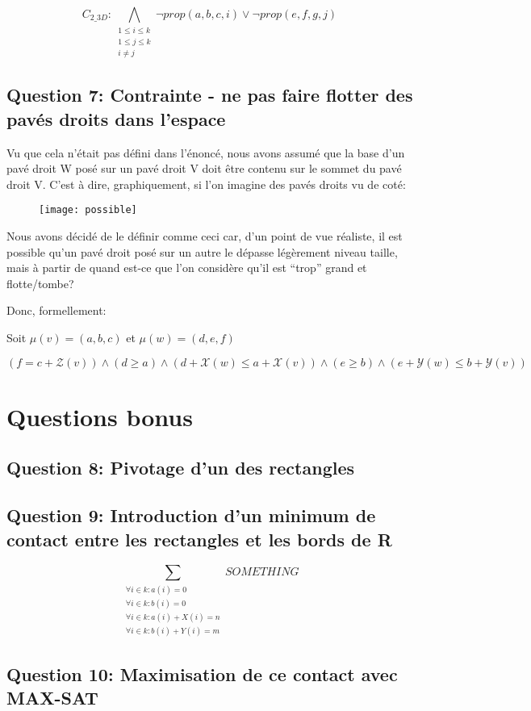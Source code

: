 \documentclass[a4paper,10pt]{article}
\begin{document}
$$C_{2\_3D} : \bigwedge_{\substack{1 \leq i \leq k \\ 1 \leq j \leq k \\ i \neq j}} \neg prop(a,b,c,i) \lor \neg prop(e,f,g,j)$$


\newpage

\subsection{Question 7: Contrainte - ne pas faire flotter des pavés droits dans l'espace}

Vu que cela n'était pas défini dans l'énoncé, nous avons assumé que la base d'un pavé droit W posé sur un pavé droit V doit être contenu sur le sommet du pavé droit V. C'est à dire, graphiquement, si l'on imagine des pavés droits vu de coté:

\begin{figure}[htb!]
\centering
\texttt{[image: possible]}
\end{figure}

Nous avons décidé de le définir comme ceci car, d'un point de vue réaliste, il est possible qu'un pavé droit posé sur un autre le dépasse légèrement niveau taille, mais à partir de quand est-ce que l'on considère qu'il est ``trop'' grand et flotte/tombe?

Donc, formellement: 

Soit $\mu(v) = (a,b,c)$ et $\mu(w) = (d,e,f)$

$(f = c + \mathcal{Z}(v)) \land (d \geq a) \land (d+\mathcal{X}(w) \leq a+\mathcal{X}(v)) \land (e \geq b) \land(e+\mathcal{Y}(w) \leq b+\mathcal{Y}(v))$ 

\section{Questions bonus}

\subsection{Question 8: Pivotage d'un des rectangles}

\subsection{Question 9: Introduction d'un minimum de contact entre les rectangles et les bords de R}

$$ \sum_{\substack{\forall i \in k : a(i) = 0\\
                \forall i \in k : b(i) = 0\\
                \forall i \in k : a(i)+ X(i) = n\\
                \forall i \in k : b(i)+ Y(i) = m }}
SOMETHING $$

\subsection{Question 10: Maximisation de ce contact avec MAX-SAT}
\end{document}
